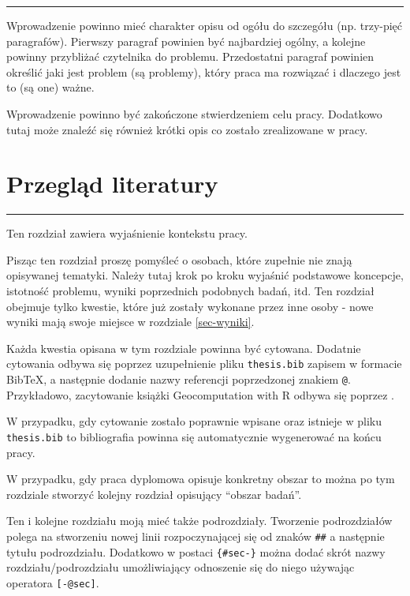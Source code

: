 \documentclass{amuthesis}
\begin{document}
\begin{center}\rule{0.5\linewidth}{0.5pt}\end{center}

Wprowadzenie powinno mieć charakter opisu od ogółu do szczegółu (np.
trzy-pięć paragrafów). Pierwszy paragraf powinien być najbardziej
ogólny, a kolejne powinny przybliżać czytelnika do problemu.
Przedostatni paragraf powinien określić jaki jest problem (są problemy),
który praca ma rozwiązać i dlaczego jest to (są one) ważne.

Wprowadzenie powinno być zakończone stwierdzeniem celu pracy. Dodatkowo
tutaj może znaleźć się również krótki opis co zostało zrealizowane w
pracy.


\hypertarget{sec-lit}{%
\chapter{Przegląd literatury}\label{sec-lit}}

\begin{center}\rule{0.5\linewidth}{0.5pt}\end{center}

Ten rozdział zawiera wyjaśnienie kontekstu pracy.

Pisząc ten rozdział proszę pomyśleć o osobach, które zupełnie nie znają
opisywanej tematyki. Należy tutaj krok po kroku wyjaśnić podstawowe
koncepcje, istotność problemu, wyniki poprzednich podobnych badań, itd.
Ten rozdział obejmuje tylko kwestie, które już zostały wykonane przez
inne osoby - nowe wyniki mają swoje miejsce w rozdziale
\ref{sec-wyniki}.

Każda kwestia opisana w tym rozdziale powinna być cytowana. Dodatnie
cytowania odbywa się poprzez uzupełnienie pliku \texttt{thesis.bib}
zapisem w formacie BibTeX, a następnie dodanie nazwy referencji
poprzedzonej znakiem \texttt{@}. Przykładowo, zacytowanie książki
Geocomputation with R odbywa się poprzez
\autocite{lovelace_geocomputation_2019}.

W przypadku, gdy cytowanie zostało poprawnie wpisane oraz istnieje w
pliku \texttt{thesis.bib} to bibliografia powinna się automatycznie
wygenerować na końcu pracy.

W przypadku, gdy praca dyplomowa opisuje konkretny obszar to można po
tym rozdziale stworzyć kolejny rozdział opisujący ``obszar badań''.

Ten i kolejne rozdziału moją mieć także podrozdziały. Tworzenie
podrozdziałów polega na stworzeniu nowej linii rozpoczynającej się od
znaków \texttt{\#\#} a następnie tytułu podrozdziału. Dodatkowo w
postaci \texttt{\{\#sec-\}} można dodać skrót nazwy
rozdziału/podrozdziału umożliwiający odnoszenie się do niego używając
operatora \texttt{{[}-@sec{]}}.
\end{document}
